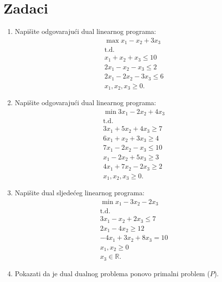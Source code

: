 \documentclass[a4paper, utf8, 11pt, colorlinks]{book}
\theoremstyle{definition}
\begin{document}
\section{Zadaci}
\begin{enumerate}
	\item %
	Napišite odgovarajući dual linearnog programa:
	\begin{align*}
		 &\max x_1 - x_2 + 3 x_3 \\
		 & \mbox{t.d.} \\
		 & x_1 + x_2 + x_3 \leq 10 \\
		 & 2x_1 - x_2 - x_3 \leq 2 \\
		 & 2x_1 - 2x_2 - 3 x_3 \leq 6 \\
		 & x_1, x_2, x_3 \geq 0.
	\end{align*}
 \item    	Napišite odgovarajući dual linearnog programa:
      \begin{align*}
      	  &\min 3 x_1 - 2 x_2 + 4 x_3 \\
      	  & \mbox{t.d.} \\
      	  & 3x_1 + 5 x_2 + 4 x_3 \geq 7 \\
      	  & 6 x_1 + x_2 + 3 x_3 \geq 4 \\
      	  & 7 x_1 - 2 x_2 - x_3 \leq 10 \\
      	  & x_1 - 2 x_2 + 5 x_3 \geq 3 \\
      	  & 4 x_1 + 7 x_2 - 2 x_3 \geq 2 \\
      	  & x_1, x_2, x_3 \geq 0.
      \end{align*}
  \item Napišite dual sljedećeg linearnog programa:
  \begin{align*}
        &\min x_1 - 3 x_2 - 2 x_3 \\
        &\mbox{t.d.} \\
        & 3 x_1 - x_2 + 2 x_3 \leq 7 \\
        & 2 x_1 - 4 x_2 \geq 12 \\
        & -4x_1 + 3x_2 + 8 x_3 = 10 \\
        & x_1, x_2\geq 0 \\
        & x_3 \in \mathbb{R}. 
  \end{align*}
\item %
Pokazati da je dual dualnog problema ponovo primalni problem ($P$).


\end{enumerate}
\end{document}
